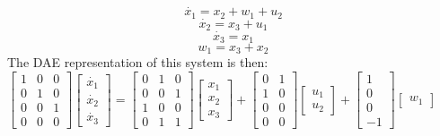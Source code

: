 \begin{equation}
\dot{x_1}=x_2+w_1+u_2
\end{equation}
\begin{equation}
\dot{x_2}=x_3+u_1
\end{equation}
\begin{equation}
\dot{x_3}=x_1
\end{equation}
\begin{equation}
w_1=x_3+x_2
\end{equation}\newline The DAE representation of this system is then:\\\newline
$
\begin{bmatrix}  1 & 0 & 0 \\ 0 & 1 & 0  \\ 0 & 0 & 1 \\ 0 & 0 & 0   \end{bmatrix}  \left[ \begin{array}{c} \dot{x_1} \\ \dot{x_2} \\ \dot{x_3} \end{array} \right]
= \begin{bmatrix} 0 & 1 & 0 \\ 0 & 0 & 1 \\ 1 & 0 & 0 \\ 0 & 1 & 1 \end{bmatrix}  \left[ \begin{array}{c} x_1 \\ x_2 \\ x_3 \end{array} \right] + \begin{bmatrix} 0 & 1 \\ 1 & 0 \\ 0 & 0 \\ 0 & 0 \end{bmatrix} \left[ \begin{array}{c} u_1 \\ u_2 \end{array} \right]+
\begin{bmatrix} 1 \\ 0 \\ 0  \\ -1 \end{bmatrix} \left[ \begin{array}{c} w_1 \end{array} \right]$\\\newline
